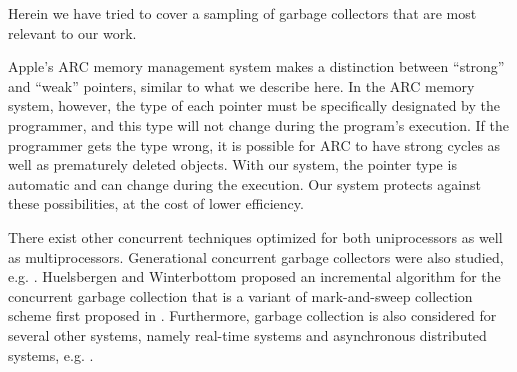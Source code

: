 


Herein we have tried to cover a sampling of garbage collectors that are most relevant to our work.

Apple's ARC memory management system makes a distinction between ``strong'' and ``weak'' pointers, similar to what we describe here. In the ARC memory system, however, the type of each pointer must be specifically designated by the programmer, and this type will not change during the program's execution. If the programmer gets the type wrong, it is possible for ARC to have strong cycles as well as prematurely deleted objects. With our system, the pointer type is automatic and can change during the execution. Our system protects against these possibilities, at the cost of lower efficiency.

There exist other concurrent techniques optimized for both uniprocessors as well as multiprocessors. Generational concurrent garbage collectors were also studied, e.g. \cite{Printezis:2000}. Huelsbergen and Winterbottom \cite{Huelsbergen1998} proposed an incremental algorithm for the concurrent garbage collection that is a variant of mark-and-sweep collection scheme first proposed in \cite{McCarthy1960}.
Furthermore, garbage collection is also considered for several other systems, namely real-time systems %
and asynchronous distributed systems, e.g. \cite{Pizlo2008,Veiga2005}. %

